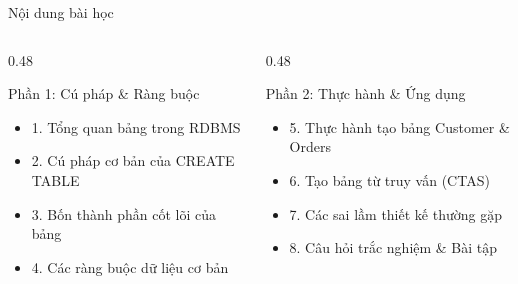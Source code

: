 \documentclass[aspectratio=169,11pt]{beamer}
\begin{document}
\begin{frame}{Nội dung bài học}
\begin{columns}[t]
  \begin{column}{0.48\textwidth}
    \begin{block}{Phần 1: Cú pháp \& Ràng buộc}
      \begin{itemize}\setlength{\itemsep}{1.5pt}
        \item 1. Tổng quan bảng trong RDBMS
        \item 2. Cú pháp cơ bản của CREATE TABLE
        \item 3. Bốn thành phần cốt lõi của bảng
        \item 4. Các ràng buộc dữ liệu cơ bản
      \end{itemize}
    \end{block}
  \end{column}
  \begin{column}{0.48\textwidth}
    \begin{block}{Phần 2: Thực hành \& Ứng dụng}
      \begin{itemize}\setlength{\itemsep}{1.5pt}
        \item 5. Thực hành tạo bảng Customer \& Orders
        \item 6. Tạo bảng từ truy vấn (CTAS)
        \item 7. Các sai lầm thiết kế thường gặp
        \item 8. Câu hỏi trắc nghiệm \& Bài tập
      \end{itemize}
    \end{block}
  \end{column}
\end{columns}
\end{frame}

\end{document}

